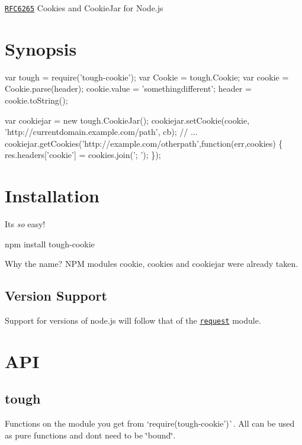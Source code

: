\href{https://tools.ietf.org/html/rfc6265}{\tt R\+F\+C6265} Cookies and Cookie\+Jar for Node.\+js

\href{https://nodei.co/npm/tough-cookie/}{\tt }

\href{https://travis-ci.org/salesforce/tough-cookie}{\tt }

\section*{Synopsis}


\begin{DoxyCode}
var tough = require('tough-cookie');
var Cookie = tough.Cookie;
var cookie = Cookie.parse(header);
cookie.value = 'somethingdifferent';
header = cookie.toString();

var cookiejar = new tough.CookieJar();
cookiejar.setCookie(cookie, 'http://currentdomain.example.com/path', cb);
// ...
cookiejar.getCookies('http://example.com/otherpath',function(err,cookies) \{
  res.headers['cookie'] = cookies.join('; ');
\});
\end{DoxyCode}


\section*{Installation}

It\textquotesingle{}s {\itshape so} easy!

{\ttfamily npm install tough-\/cookie}

Why the name? N\+PM modules {\ttfamily cookie}, {\ttfamily cookies} and {\ttfamily cookiejar} were already taken.

\subsection*{Version Support}

Support for versions of node.\+js will follow that of the \href{https://www.npmjs.com/package/request}{\tt request} module.

\section*{A\+PI}

\subsection*{tough}

Functions on the module you get from `require(\textquotesingle{}tough-\/cookie')\`{}. All can be used as pure functions and don\textquotesingle{}t need to be \char`\"{}bound\char`\"{}.

